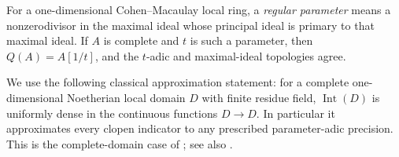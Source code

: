 For a one-dimensional Cohen--Macaulay local ring, a
\emph{regular parameter} means a nonzerodivisor in the maximal ideal
whose principal ideal is primary to that maximal ideal.
If $A$ is complete and $t$ is such a parameter, then
$Q(A)=A[1/t]$, and the $t$-adic and maximal-ideal topologies agree.

We use the following classical approximation statement:
for a complete one-dimensional Noetherian local domain $D$ with
finite residue field, $\operatorname{Int}(D)$ is uniformly dense in
the continuous functions $D\to D$.  In particular it approximates
every clopen indicator to any prescribed parameter-adic precision.
This is the complete-domain case of
\cite[Proposition 4.3, author version pp.\ 18--19]{CahenChabert1999Skolem};
see also \cite[Section 4, pp.\ 52--53]{CahenGrazziniHaouat1982}.

